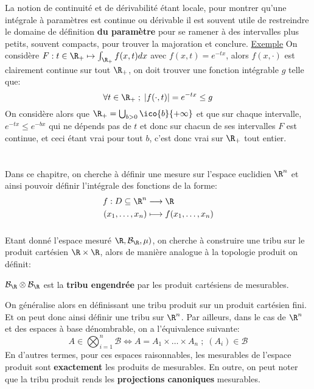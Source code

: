 \subsection*{}
La notion de continuité et de dérivabilité étant locale, pour montrer qu'une intégrale à paramètres est continue ou dérivable il est souvent utile de restreindre le domaine de définition \textbf{du paramètre} pour se ramener à des intervalles plus petits, souvent compacts, pour trouver la majoration et conclure.\<
\uline{Exemple} On considère \(F : t \in \R_+ \mapsto \int_{\R_+} f(x, t)dx\) avec \(f(x, t) = e^{-tx}\), alors \(f(x, \cdot)\) est clairement continue sur tout \(\R_+\), on doit trouver une fonction intégrable \(g\) telle que:
\[
   \forall t \in \R_+ \; ; \; |f(\cdot, t)| = e^{-tx} \leq g
\]
On considère alors que \(\R_+ = \bigcup_{b > 0} \ico{b}{+\infty}\) et que sur chaque intervalle, \(e^{-tx} \leq e^{-bx}\) qui ne dépends pas de \(t\) et donc sur chacun de ses intervalles \(F\) est continue, et ceci étant vrai pour tout \(b\), c'est donc vrai sur \(\R_+\) tout entier.

\chapter*{} %
Dans ce chapitre, on cherche à définir une mesure sur l'espace euclidien \( \R^n \) et ainsi pouvoir définir l'intégrale des fonctions de la forme:
\[ 
   \begin{aligned}
      f : D \subseteq \R^n &\longrightarrow \R\\
      (x_1, \ldots, x_n) &\longmapsto f(x_1, \ldots, x_n)
   \end{aligned}
\]

\subsection*{}
Etant donné l'espace mesuré \(  \R, \mathcal{B}_{ \R}, \mu) \), on cherche à construire une tribu sur le produit cartésien \( \R \times \R \), alors de manière analogue à la topologie produit on définit:
\begin{center}
   \(    \mathcal{B}_{ \R} \otimes \mathcal{B}_{ \R}  \) est la \textbf{tribu engendrée} par les produit cartésiens de mesurables.
\end{center} 
On généralise alors en définissant une tribu produit sur un produit cartésien fini. Et on peut donc ainsi définir une tribu sur \( \R^n \). Par ailleurs, dans le cas de \( \R^n \) et des espaces à base dénombrable, on a l'équivalence suivante:
\[ 
   A \in \bigotimes_{i=1}^n \mathcal{B} \iff A = A_1 \times \ldots \times A_n \; ; \; (A_i) \in \mathcal{B} 
\]
En d'autres termes, pour ces espaces raisonnables, les mesurables de l'espace produit sont \textbf{exactement} les produits de mesurables. En outre, on peut noter que la tribu produit rends les \textbf{projections canoniques} mesurables.

